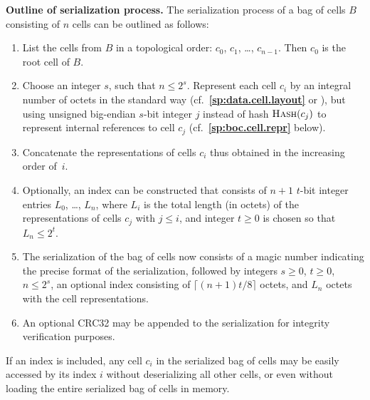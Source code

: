 \documentclass[12pt,oneside]{article}
\def\makepoint#1{\medbreak\noindent{\bf #1.\ }}
\def\nxsubpoint{\refstepcounter{subsubsection}%
  \smallbreak\makepoint{\thesubsubsection}}
\def\refpoint#1{{\rm\textbf{\ref{#1}}}}
\let\ptref=\refpoint
\def\emb#1{\textbf{#1.}}
\def\opsc#1{\operatorname{\textsc{#1}}}
\def\Hash{\opsc{Hash}}
\begin{document}
\nxsubpoint\label{sp:outline.ser.boc}\emb{Outline of serialization process}
The serialization process of a bag of cells $B$ consisting of $n$ cells can be outlined as follows:
\begin{enumerate}
\item List the cells from $B$ in a topological order: $c_0$, $c_1$, \dots, $c_{n-1}$. Then $c_0$ is the root cell of $B$.
\item Choose an integer $s$, such that $n\leq 2^s$. Represent each cell $c_i$ by an integral number of octets in the standard way (cf.~\ptref{sp:data.cell.layout} or \cite[3.1.4]{TVM}), but using unsigned big-endian $s$-bit integer $j$ instead of hash $\Hash(c_j)$ to represent internal references to cell $c_j$ (cf.~\ptref{sp:boc.cell.repr} below).
\item Concatenate the representations of cells $c_i$ thus obtained in the increasing order of~$i$.
\item Optionally, an index can be constructed that consists of $n+1$ $t$-bit integer entries $L_0$, \dots, $L_n$, where $L_i$ is the total length (in octets) of the representations of cells $c_j$ with $j\leq i$, and integer $t\geq0$ is chosen so that $L_n\leq 2^t$.
\item The serialization of the bag of cells now consists of a magic number indicating the precise format of the serialization, followed by integers $s\geq 0$, $t\geq0$, $n\leq 2^s$, an optional index consisting of $\lceil(n+1)t/8\rceil$ octets, and $L_n$ octets with the cell representations.
\item An optional CRC32 may be appended to the serialization for integrity verification purposes.
\end{enumerate}
If an index is included, any cell $c_i$ in the serialized bag of cells may be easily accessed by its index $i$ without deserializing all other cells, or even without loading the entire serialized bag of cells in memory.
\end{document}
